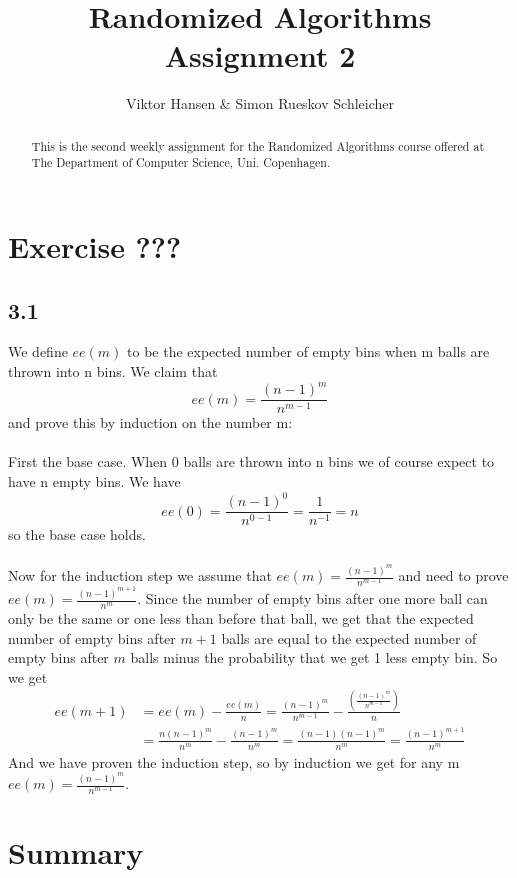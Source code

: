 \documentclass[12pt]{article}
\begin{document}
\nocite{*}


\title{Randomized Algorithms \\
       Assignment 2}

\author{Viktor Hansen \& Simon Rueskov Schleicher}

\maketitle

\begin{abstract}
  This is the second weekly assignment for the Randomized Algorithms course offered at The Department of Computer Science, Uni. Copenhagen.
\end{abstract}

\pagebreak

\section*{Exercise ???}

\subsection*{3.1}
We define $ee(m)$ to be the expected number of empty bins when m balls are thrown into n bins. We claim that $$ee(m)=\frac{(n-1)^m}{n^{m-1}}$$ and prove this by induction on the number m:\\
\\
First the base case. When 0 balls are thrown into n bins we of course expect to have n empty bins. We have $$ee(0)=\frac{(n-1)^0}{n^{0-1}}=\frac{1}{n^{-1}}=n$$ so the base case holds.\\
\\
Now for the induction step we assume that $ee(m)=\frac{(n-1)^m}{n^{m-1}}$ and need to prove $ee(m)=\frac{(n-1)^{m+1}}{n^m}$. Since the number of empty bins after one more ball can only be the same or one less than before that ball, we get that the expected number of empty bins after $m+1$ balls are equal to the expected number of empty bins after $m$ balls minus the probability that we get 1 less empty bin. So we get \begin{align*}ee(m+1)&=ee(m)-\frac{ee(m)}{n}=\frac{(n-1)^m}{n^{m-1}}-\frac{\left(\frac{(n-1)^m}{n^{m-1}}\right)}{n}\\&=\frac{n(n-1)^m}{n^m}-\frac{(n-1)^m}{n^m}=\frac{(n-1)(n-1)^m}{n^m}=\frac{(n-1)^{m+1}}{n^m}\end{align*}
And we have proven the induction step, so by induction we get for any m $ee(m)=\frac{(n-1)^m}{n^{m-1}}$.

\pagebreak

\section*{Summary}
\end{document}
